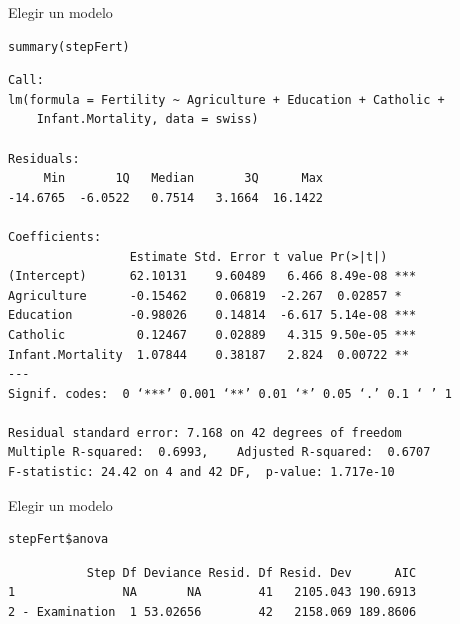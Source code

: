 \documentclass[xcolor={usenames,svgnames,dvipsnames}]{beamer}
\begin{document}
\begin{frame}[fragile,label=sec-3-12]{Elegir un modelo}
 \lstset{language=R,numbers=none}
\begin{lstlisting}
summary(stepFert)
\end{lstlisting}

\begin{verbatim}
Call:
lm(formula = Fertility ~ Agriculture + Education + Catholic + 
    Infant.Mortality, data = swiss)

Residuals:
     Min       1Q   Median       3Q      Max 
-14.6765  -6.0522   0.7514   3.1664  16.1422 

Coefficients:
                 Estimate Std. Error t value Pr(>|t|)    
(Intercept)      62.10131    9.60489   6.466 8.49e-08 ***
Agriculture      -0.15462    0.06819  -2.267  0.02857 *  
Education        -0.98026    0.14814  -6.617 5.14e-08 ***
Catholic          0.12467    0.02889   4.315 9.50e-05 ***
Infant.Mortality  1.07844    0.38187   2.824  0.00722 ** 
---
Signif. codes:  0 ‘***’ 0.001 ‘**’ 0.01 ‘*’ 0.05 ‘.’ 0.1 ‘ ’ 1

Residual standard error: 7.168 on 42 degrees of freedom
Multiple R-squared:  0.6993,	Adjusted R-squared:  0.6707 
F-statistic: 24.42 on 4 and 42 DF,  p-value: 1.717e-10
\end{verbatim}
\end{frame}
\begin{frame}[fragile,label=sec-3-13]{Elegir un modelo}
 \lstset{language=R,numbers=none}
\begin{lstlisting}
stepFert$anova
\end{lstlisting}

\begin{verbatim}
           Step Df Deviance Resid. Df Resid. Dev      AIC
1               NA       NA        41   2105.043 190.6913
2 - Examination  1 53.02656        42   2158.069 189.8606
\end{verbatim}
\end{frame}
\end{document}
